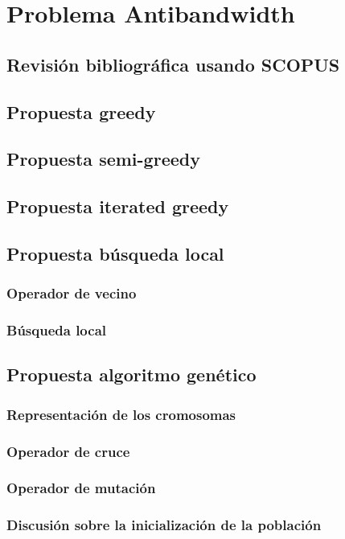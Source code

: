 \section{Problema Antibandwidth}

\subsection{Revisión bibliográfica usando SCOPUS}

\subsection{Propuesta greedy}

\subsection{Propuesta semi-greedy}

\subsection{Propuesta iterated greedy}

\subsection{Propuesta búsqueda local}

\subsubsection{Operador de vecino}

\subsubsection{Búsqueda local}



\subsection{Propuesta algoritmo genético}

\subsubsection{Representación de los cromosomas}

\subsubsection{Operador de cruce}

\subsubsection{Operador de mutación}

\subsubsection{Discusión sobre la inicialización de la población}

